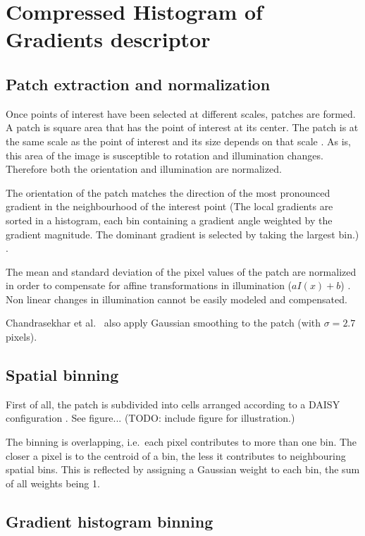 \section{Compressed Histogram of Gradients descriptor}

\subsection{Patch extraction and normalization}

Once points of interest have been selected at different scales, patches are formed. A patch is square area that has the point of interest at its center. The patch is at the same scale as the point of interest and its size depends on that scale \cite{Mikolajczyk2005PEL}. As is, this area of the image is susceptible to rotation and illumination changes. Therefore both the orientation and illumination are normalized.

The orientation of the patch matches the direction of the most pronounced gradient in the neighbourhood of the interest point (The local gradients are sorted in a histogram, each bin containing a gradient angle weighted by the gradient magnitude. The dominant gradient is selected by taking the largest bin.) \cite{Lowe04distinctiveimage}.

The mean and standard deviation of the pixel values of the patch are normalized in order to compensate for affine transformations in illumination ($aI(x) + b$) \cite{Mikolajczyk2005PEL}. Non linear changes in illumination cannot be easily modeled and compensated.

Chandrasekhar et al.\ \cite{chog2011} also apply Gaussian smoothing to the patch (with $\sigma = 2.7$ pixels).

\subsection{Spatial binning}

First of all, the patch is subdivided into cells arranged according to a DAISY configuration \cite{Tola08,best_daisy}. See figure... (TODO: include figure for illustration.)

The binning is overlapping, i.e.\ each pixel contributes to more than one bin.  The closer a pixel is to the centroid of a bin, the less it contributes to neighbouring spatial bins. This is reflected by assigning a Gaussian weight to each bin, the sum of all weights being 1.

\subsection{Gradient histogram binning}


